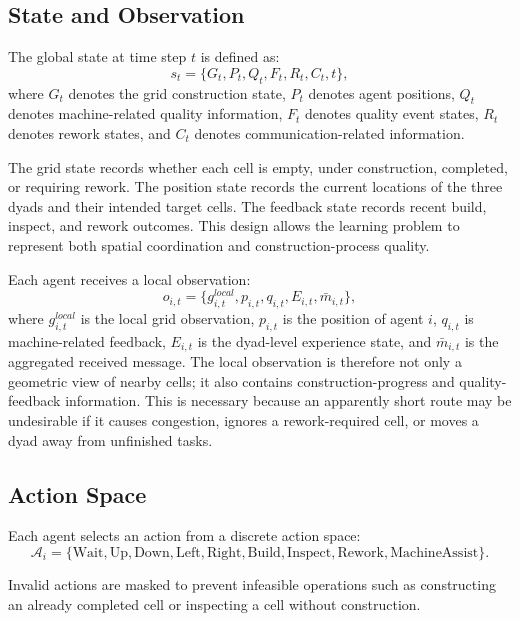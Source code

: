 \documentclass[fleqn,10pt]{wlpeerj}
\begin{document}
\subsection{State and Observation}

The global state at time step $t$ is defined as:
\begin{equation}
s_t = \{G_t, P_t, Q_t, F_t, R_t, C_t, t\},
\end{equation}
where $G_t$ denotes the grid construction state, $P_t$ denotes agent positions, $Q_t$ denotes machine-related quality information, $F_t$ denotes quality event states, $R_t$ denotes rework states, and $C_t$ denotes communication-related information.

The grid state records whether each cell is empty, under construction, completed, or requiring rework. The position state records the current locations of the three dyads and their intended target cells. The feedback state records recent build, inspect, and rework outcomes. This design allows the learning problem to represent both spatial coordination and construction-process quality.

Each agent receives a local observation:
\begin{equation}
o_{i,t} =
\{g^{local}_{i,t}, p_{i,t}, q_{i,t}, E_{i,t}, \bar{m}_{i,t}\},
\end{equation}
where $g^{local}_{i,t}$ is the local grid observation, $p_{i,t}$ is the position of agent $i$, $q_{i,t}$ is machine-related feedback, $E_{i,t}$ is the dyad-level experience state, and $\bar{m}_{i,t}$ is the aggregated received message. The local observation is therefore not only a geometric view of nearby cells; it also contains construction-progress and quality-feedback information. This is necessary because an apparently short route may be undesirable if it causes congestion, ignores a rework-required cell, or moves a dyad away from unfinished tasks.

\subsection{Action Space}

Each agent selects an action from a discrete action space:
\begin{equation}
\mathcal{A}_i =
\{\text{Wait}, \text{Up}, \text{Down}, \text{Left}, \text{Right},
\text{Build}, \text{Inspect}, \text{Rework}, \text{MachineAssist}\}.
\end{equation}

Invalid actions are masked to prevent infeasible operations such as constructing an already completed cell or inspecting a cell without construction.
\end{document}
